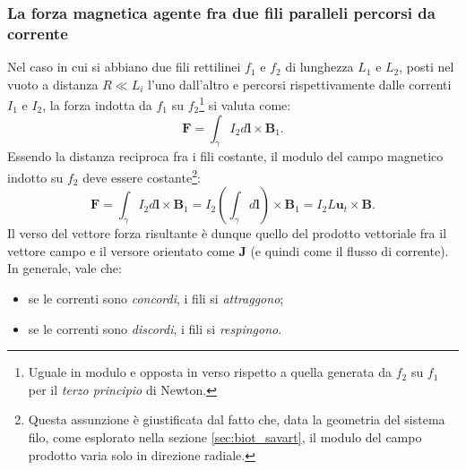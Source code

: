 \documentclass[a4paper,11pt]{report}
\begin{document}
\subsubsection{La forza magnetica agente fra due fili paralleli percorsi da corrente}
Nel caso in cui si abbiano due fili rettilinei $f_1$ e $f_2$ di lunghezza $L_1$ e $L_2$, posti nel vuoto a distanza $R \ll L_i$ l'uno dall'altro e percorsi rispettivamente dalle correnti $I_1$ e $I_2$, la forza indotta da $f_1$ su $f_2$\footnote{Uguale in modulo e opposta in verso rispetto a quella generata da $f_2$ su $f_1$ per il \textit{terzo principio} di Newton.} si valuta come:
\begin{equation}
\bm{F} =  \int_\gamma I_2 d\bm{l}\times \bm{B}_1.
\end{equation} 
Essendo la distanza reciproca fra i fili costante, il modulo del campo magnetico indotto su $f_2$ deve essere costante\footnote{Questa assunzione è giustificata dal fatto che, data la geometria del sistema filo, come esplorato nella sezione \ref{sec:biot_savart}, il modulo del campo prodotto varia solo in direzione radiale.}:
\begin{equation}
\bm{F} =  \int_\gamma I_2 d\bm{l}\times \bm{B}_1 = I_2 \left(\int_\gamma d\bm{l}\right)\times \bm{B}_1 = I_2 L \bm{u}_t \times \bm{B}.
\end{equation} 
Il verso del vettore forza risultante è dunque quello del prodotto vettoriale fra il vettore campo e il versore orientato come $\bm{J}$ (e quindi come il flusso di corrente). In generale, vale che:
\begin{itemize}
    \item se le correnti sono \textit{concordi}, i fili si \textit{attraggono};
    \item se le correnti sono \textit{discordi}, i fili si \textit{respingono}.
\end{itemize}
\end{document}
